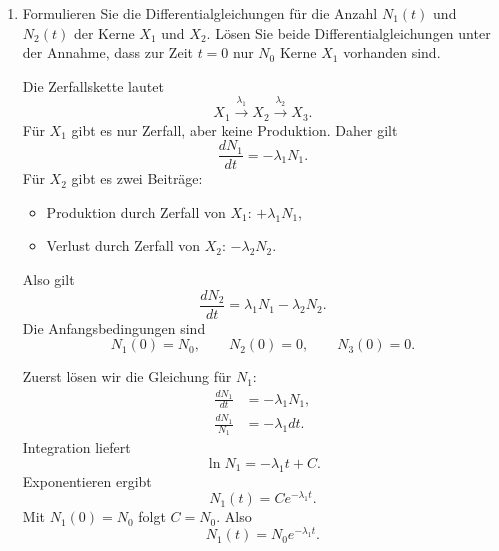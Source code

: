 \documentclass[11pt,a4paper]{scrartcl}
\begin{document}
    \begin{enumerate}[label=(\alph*)]
        \item
            Formulieren Sie die Differentialgleichungen für die Anzahl $N_1(t)$ und $N_2(t)$ der Kerne $X_1$ und $X_2$.
            Lösen Sie beide Differentialgleichungen unter der Annahme, dass zur Zeit $t=0$ nur $N_0$ Kerne $X_1$ vorhanden sind.

            \begin{calculationbox}
                Die Zerfallskette lautet
                \[
                    X_1 \xrightarrow{\lambda_1} X_2 \xrightarrow{\lambda_2} X_3.
                \]
                Für $X_1$ gibt es nur Zerfall, aber keine Produktion. Daher gilt
                \[
                    \frac{dN_1}{dt}=-\lambda_1N_1.
                \]
                Für $X_2$ gibt es zwei Beiträge:
                \begin{itemize}
                    \item Produktion durch Zerfall von $X_1$: $+\lambda_1N_1$,
                    \item Verlust durch Zerfall von $X_2$: $-\lambda_2N_2$.
                \end{itemize}
                Also gilt
                \[
                    \frac{dN_2}{dt}=\lambda_1N_1-\lambda_2N_2.
                \]
                Die Anfangsbedingungen sind
                \[
                    N_1(0)=N_0,
                    \qquad
                    N_2(0)=0,
                    \qquad
                    N_3(0)=0.
                \]
            \end{calculationbox}

            \begin{calculationbox}
                Zuerst lösen wir die Gleichung für $N_1$:
                \begin{align*}
                    \frac{dN_1}{dt}&=-\lambda_1N_1,\\
                    \frac{dN_1}{N_1}&=-\lambda_1dt.
                \end{align*}
                Integration liefert
                \[
                    \ln N_1=-\lambda_1t+C.
                \]
                Exponentieren ergibt
                \[
                    N_1(t)=Ce^{-\lambda_1t}.
                \]
                Mit $N_1(0)=N_0$ folgt $C=N_0$. Also
                \[
                    \boxed{N_1(t)=N_0e^{-\lambda_1t}.}
                \]
            \end{calculationbox}


\end{enumerate}
\end{document}
